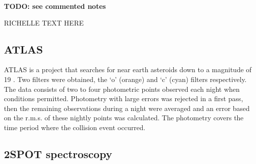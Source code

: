 \documentclass{aa}
\begin{document}
\textbf{TODO: see commented notes}



RICHELLE TEXT HERE

\subsection{ATLAS}

ATLAS is a project that searches for near earth asteroids down to a magnitude of 19 \citep{Tonry18}.
%
Two filters were obtained, the `o' (orange) and `c' (cyan) filters respectively.
%
The data consists of two to four photometric points observed each night when conditions permitted.
%
Photometry with large errors was rejected in a first pass, then the remaining observations during a night were averaged and an error based on the r.m.s. of these nightly points was calculated.
%
The photometry covers the time period where the collision event occurred. 

\subsection{2SPOT spectroscopy}
\end{document}
